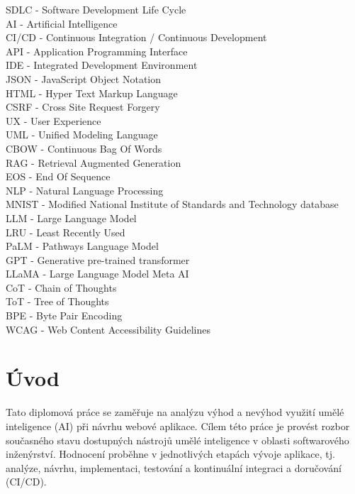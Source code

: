 \documentclass[FM,DP]{tulthesis}
\begin{document}
		\begin{abbrList}
			SDLC - Software Development Life Cycle \\
			AI - Artificial Intelligence \\
			CI/CD - Continuous Integration / Continuous Development \\
			API - Application Programming Interface \\
			IDE - Integrated Development Environment \\
			JSON - JavaScript Object Notation \\
			HTML - Hyper Text Markup Language \\
			CSRF - Cross Site Request Forgery \\
			UX - User Experience \\
			UML - Unified Modeling Language \\
			CBOW - Continuous Bag Of Words \\
			RAG - Retrieval Augmented Generation \\
			EOS - End Of Sequence \\
			NLP - Natural Language Processing \\
			MNIST - Modified National Institute of Standards and Technology database \\
			LLM - Large Language Model \\
			LRU - Least Recently Used \\
			PaLM - Pathways Language Model \\
			GPT - Generative pre-trained transformer \\
			LLaMA - Large Language Model Meta AI \\
			CoT - Chain of Thoughts \\
			ToT - Tree of Thoughts \\
			BPE - Byte Pair Encoding \\
			WCAG - Web Content Accessibility Guidelines \\
		\end{abbrList}
	
		\clearpage
		\listoffigures
		\clearpage 
		
		\chapter{Úvod}
		Tato diplomová práce se zaměřuje na analýzu výhod a nevýhod využití umělé inteligence (AI) při návrhu webové aplikace. Cílem této práce je provést rozbor současného stavu dostupných nástrojů umělé inteligence v oblasti softwarového inženýrství. Hodnocení proběhne v jednotlivých etapách vývoje aplikace, tj. analýze, návrhu, implementaci, testování a kontinuální integraci a doručování (CI/CD).
		
\end{document}
